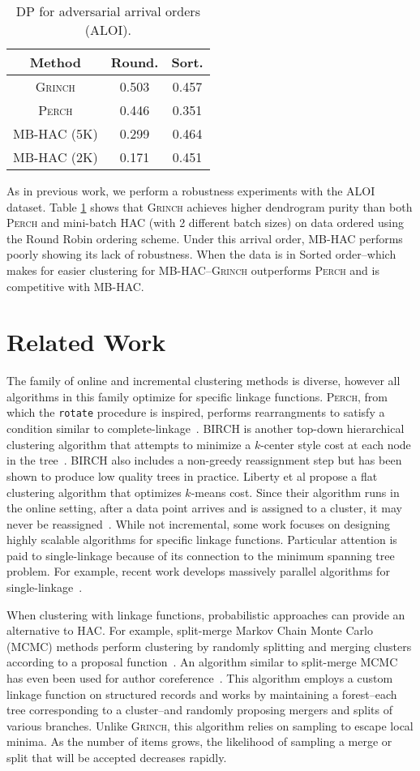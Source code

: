 \documentclass{article} \usepackage[utf8]{inputenc} \usepackage[T1]{fontenc}    \usepackage{hyperref}       \usepackage{url}            \usepackage{booktabs}       \usepackage{amsfonts}       \usepackage{nicefrac}       \usepackage{microtype}      \usepackage{geometry}
\newcommand{\perch}{\textsc{Perch}\xspace}
\newcommand{\alg}{\textsc{Grinch}\xspace}
\newcommand{\hac}{\textsc{HAC}\xspace}
\newcommand{\rotate}{\texttt{rotate}\xspace}
\newcommand{\hof}{linkage function\xspace}
\newcommand{\hofs}{linkage functions\xspace}
\begin{document}
\begin{table}
\centering
  \begin{tabular}{c c c }
\hline
\bf Method  & Round. & Sort. \\
\hline
\alg      & 0.503 & 0.457 \\
\perch        & 0.446  &  0.351 \\
MB-HAC (5K) & 0.299  &  0.464 \\
MB-HAC (2K) & 0.171  &  0.451 \\
\hline
\end{tabular}
\caption{DP for adversarial arrival orders (ALOI).}
\label{tab:robust-dp}
\end{table} \noindent As in previous work, we perform a robustness experiments
with the ALOI dataset. Table \ref{tab:robust-dp} shows that \alg
achieves higher dendrogram purity than both \perch and mini-batch HAC
(with 2 different batch sizes) on data ordered using the Round Robin
ordering scheme. Under this arrival order, MB-HAC performs poorly
showing its lack of robustness. When the data is in Sorted
order--which makes for easier clustering for MB-HAC--\alg outperforms
\perch and is competitive with MB-HAC. \section{Related Work}
\label{sec:related}
The family of online and incremental clustering methods is diverse,
however all algorithms in this family optimize for specific
\hofs. \perch, from which the \rotate procedure is inspired, performs
rearrangments to satisfy a condition similar to
complete-linkage~\cite{kobren2017hierarchical}. BIRCH is another
top-down hierarchical clustering algorithm that attempts to minimize a
$k$-center style cost at each node in the
tree~\cite{zhang1996birch}. BIRCH also includes a non-greedy
reassignment step but has been shown to produce low quality trees in
practice. Liberty et al propose a flat clustering algorithm that
optimizes $k$-means cost. Since their algorithm runs in the online
setting, after a data point arrives and is assigned to a cluster, it
may never be reassigned~\cite{liberty2016algorithm}. While not
incremental, some work focuses on designing highly scalable algorithms
for specific linkage functions. Particular attention is paid to
single-linkage because of its connection to the minimum spanning tree
problem. For example, recent work develops massively parallel
algorithms for single-linkage~\cite{bateni2017affinity}.

When clustering with \hofs, probabilistic approaches can provide an
alternative to \hac. For example, split-merge Markov Chain Monte Carlo
(MCMC) methods perform clustering by randomly splitting and merging
clusters according to a proposal function~\cite{jain2004split}. An
algorithm similar to split-merge MCMC has even been used for author
coreference~\cite{wick2012discriminative}. This algorithm employs a
custom \hof on structured records and works by maintaining a
forest--each tree corresponding to a cluster--and randomly proposing
mergers and splits of various branches. Unlike \alg, this algorithm
relies on sampling to escape local minima. As the number of items
grows, the likelihood of sampling a merge or split that will be
accepted decreases rapidly.
\end{document}
